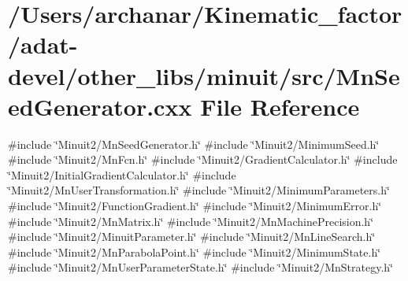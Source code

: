 \hypertarget{adat-devel_2other__libs_2minuit_2src_2MnSeedGenerator_8cxx}{}\section{/\+Users/archanar/\+Kinematic\+\_\+factor/adat-\/devel/other\+\_\+libs/minuit/src/\+Mn\+Seed\+Generator.cxx File Reference}
\label{adat-devel_2other__libs_2minuit_2src_2MnSeedGenerator_8cxx}
{\ttfamily \#include \char`\"{}Minuit2/\+Mn\+Seed\+Generator.\+h\char`\"{}}\newline
{\ttfamily \#include \char`\"{}Minuit2/\+Minimum\+Seed.\+h\char`\"{}}\newline
{\ttfamily \#include \char`\"{}Minuit2/\+Mn\+Fcn.\+h\char`\"{}}\newline
{\ttfamily \#include \char`\"{}Minuit2/\+Gradient\+Calculator.\+h\char`\"{}}\newline
{\ttfamily \#include \char`\"{}Minuit2/\+Initial\+Gradient\+Calculator.\+h\char`\"{}}\newline
{\ttfamily \#include \char`\"{}Minuit2/\+Mn\+User\+Transformation.\+h\char`\"{}}\newline
{\ttfamily \#include \char`\"{}Minuit2/\+Minimum\+Parameters.\+h\char`\"{}}\newline
{\ttfamily \#include \char`\"{}Minuit2/\+Function\+Gradient.\+h\char`\"{}}\newline
{\ttfamily \#include \char`\"{}Minuit2/\+Minimum\+Error.\+h\char`\"{}}\newline
{\ttfamily \#include \char`\"{}Minuit2/\+Mn\+Matrix.\+h\char`\"{}}\newline
{\ttfamily \#include \char`\"{}Minuit2/\+Mn\+Machine\+Precision.\+h\char`\"{}}\newline
{\ttfamily \#include \char`\"{}Minuit2/\+Minuit\+Parameter.\+h\char`\"{}}\newline
{\ttfamily \#include \char`\"{}Minuit2/\+Mn\+Line\+Search.\+h\char`\"{}}\newline
{\ttfamily \#include \char`\"{}Minuit2/\+Mn\+Parabola\+Point.\+h\char`\"{}}\newline
{\ttfamily \#include \char`\"{}Minuit2/\+Minimum\+State.\+h\char`\"{}}\newline
{\ttfamily \#include \char`\"{}Minuit2/\+Mn\+User\+Parameter\+State.\+h\char`\"{}}\newline
{\ttfamily \#include \char`\"{}Minuit2/\+Mn\+Strategy.\+h\char`\"{}}\newline
